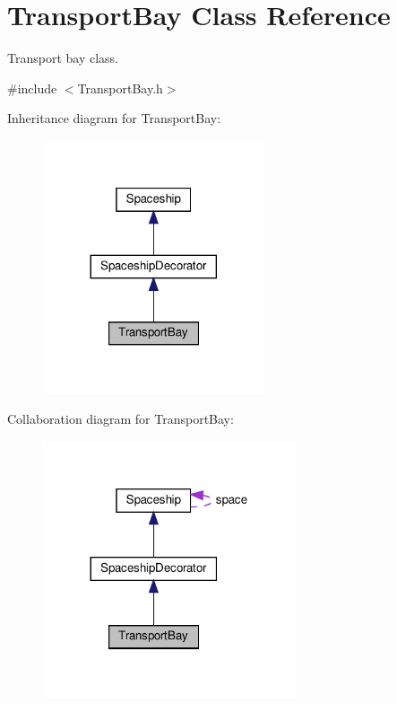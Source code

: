 \hypertarget{classTransportBay}{}\section{Transport\+Bay Class Reference}
\label{classTransportBay}


Transport bay class.  




{\ttfamily \#include $<$Transport\+Bay.\+h$>$}



Inheritance diagram for Transport\+Bay\+:\nopagebreak
\begin{figure}[H]
\begin{center}
\leavevmode
\includegraphics[width=185pt]{classTransportBay__inherit__graph}
\end{center}
\end{figure}


Collaboration diagram for Transport\+Bay\+:\nopagebreak
\begin{figure}[H]
\begin{center}
\leavevmode
\includegraphics[width=212pt]{classTransportBay__coll__graph}
\end{center}
\end{figure}
